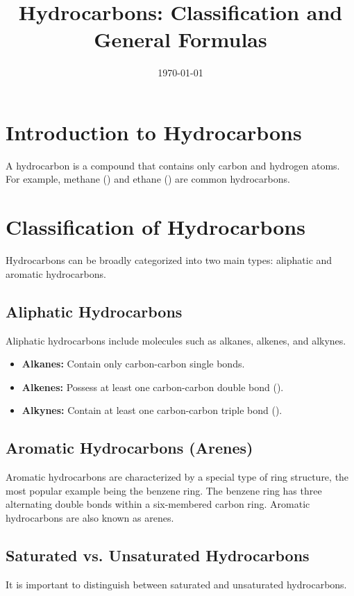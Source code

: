 \documentclass{article}
\title{Hydrocarbons: Classification and General Formulas}
\author{}
\date{\today}
\begin{document}
\maketitle

\section{Introduction to Hydrocarbons}
A hydrocarbon is a compound that contains only carbon and hydrogen atoms. For example, methane () and ethane () are common hydrocarbons.

\section{Classification of Hydrocarbons}

Hydrocarbons can be broadly categorized into two main types: aliphatic and aromatic hydrocarbons.

\subsection{Aliphatic Hydrocarbons}
Aliphatic hydrocarbons include molecules such as alkanes, alkenes, and alkynes.
\begin{itemize}
    \item \textbf{Alkanes:} Contain only carbon-carbon single bonds.
    \item \textbf{Alkenes:} Possess at least one carbon-carbon double bond ().
    \item \textbf{Alkynes:} Contain at least one carbon-carbon triple bond ().
\end{itemize}

\subsection{Aromatic Hydrocarbons (Arenes)}
Aromatic hydrocarbons are characterized by a special type of ring structure, the most popular example being the benzene ring. The benzene ring has three alternating double bonds within a six-membered carbon ring. Aromatic hydrocarbons are also known as arenes.

\subsection{Saturated vs. Unsaturated Hydrocarbons}
It is important to distinguish between saturated and unsaturated hydrocarbons.
\end{document}
